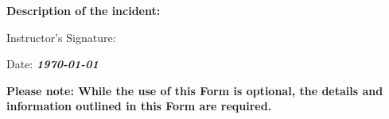 \documentclass[]{article}
\begin{document}
\noindent
\textbf{Description of the incident:} \textit{\detailsOfAllegation}


\vspace{0.8cm}
\noindent
Instructor's Signature:
\vspace{0.8cm}

\noindent
Date: \textbf{\textit{\today}}
\vspace{0.8cm}


\vspace{0.8cm}
\noindent
\textbf{Please note: While the use of this Form is optional, the details and information outlined in this Form are required.}
\end{document}
